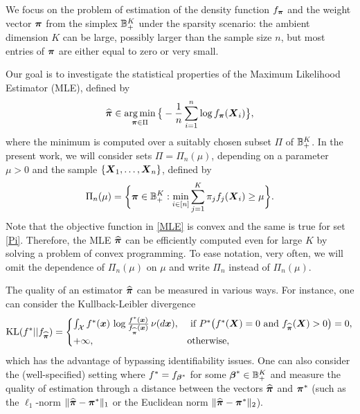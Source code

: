 We focus on the problem of estimation of the density function $f_{\boldsymbol \pi}$ and the weight vector $\boldsymbol \pi$ from the simplex
${\mathbb B}_+^K$ under the sparsity scenario: the ambient dimension $K$ can be large, possibly larger than the sample size
$n$, but most entries of $\boldsymbol \pi$ are either equal to zero or very small.

Our goal is to investigate the statistical properties of the Maximum Likelihood Estimator (MLE), defined by
\begin{equation}\label{MLE}
\widehat{\boldsymbol \pi} \in \operatorname*{arg\,min}_{\boldsymbol \pi\in \Pi}\big\{-\frac{1}{n}\sum_{i=1}^n\log f_{\boldsymbol \pi}(\boldsymbol X_i)\big\},
\end{equation}
where the minimum is computed over a suitably chosen subset $\Pi$ of ${\mathbb B}_+^K$. In the present work, we will consider
sets $\Pi=\Pi_n(\mu)$, depending on a parameter $\mu>0$ and the sample $\{\boldsymbol X_1,\ldots,\boldsymbol X_n\}$, defined by
\begin{equation}\label{Pi}
\Pi_n(\mu) = \bigg\{\boldsymbol \pi\in {\mathbb B}_+^K: \min_{i\in [n]}\sum_{j=1}^K \pi_j f_j(\boldsymbol X_i)\geq \mu\bigg\}.
\end{equation}
Note that the objective function in \eqref{MLE} is convex and the same is true for set \eqref{Pi}. Therefore, the MLE
$\widehat{\boldsymbol \pi}$ can be efficiently computed even for large $K$ by solving a problem of convex programming. To ease notation, very often,
we will omit the dependence of $\Pi_n(\mu)$ on $\mu$ and write $\Pi_n$ instead of $\Pi_n(\mu)$.

The quality of an estimator $\widehat{\boldsymbol \pi}$ can be measured in various ways. For instance, one can consider
the Kullback-Leibler divergence 
\begin{equation}
{\rm KL}(f^* ||f_{\widehat{\boldsymbol \pi}}) = 
\begin{cases}
\int_{\mathcal X} f^*(\boldsymbol x)\,\log \frac{f^*(\boldsymbol x)}{f_{\widehat{\boldsymbol \pi}}(\boldsymbol x)}\,\nu(d\boldsymbol x), &
\text{ if } P^*\big(f^*(\boldsymbol X)=0 \text{ and } f_{\widehat{\boldsymbol \pi}}(\boldsymbol X)>0\big)=0, \\
+\infty, & \text{otherwise},
\end{cases}
\end{equation}
which has the advantage of bypassing identifiability
issues. One can also consider the (well-specified) setting where $f^*=f_{\boldsymbol \beta^*}$ for some $\boldsymbol \beta^*\in{\mathbb B}^K_+$
and measure the quality of estimation through a distance between the vectors $\widehat{\boldsymbol \pi}$ and $\boldsymbol \pi^*$ (such as
the $\ell_1$-norm $\|\widehat{\boldsymbol \pi}-\boldsymbol \pi^*\|_1$ or the Euclidean norm $\|\widehat{\boldsymbol \pi}-\boldsymbol \pi^*\|_2$).


